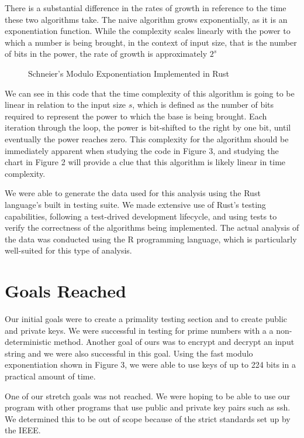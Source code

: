 \documentclass[11pt,technote]{IEEEtran}
\begin{document}
\par There is a substantial difference in the rates of growth in reference to
the time these two algorithms take. The naive algorithm grows exponentially, as
it is an exponentiation function. While the complexity scales linearly with the
power to which a number is being brought, in the context of input size, that is 
the number of bits in the power, the rate of growth is approximately $2^s$
\begin{figure}
	\begin{center}
		
		\caption{Schneier's Modulo Exponentiation Implemented in Rust\cite{sonsec}}
	\end{center}
\end{figure}
\par We can see in this code that the time complexity of this algorithm is going
to be linear in relation to the input size $s$, which is defined as the number
of bits required to represent the power to which the base is being brought. Each
iteration through the loop, the power is bit-shifted to the right by one bit,
until eventually the power reaches zero. This complexity for the algorithm
should be immediately apparent when studying the code in Figure 3, and studying
the chart in Figure 2 will provide a clue that this algorithm is likely linear
in time complexity.
\par We were able to generate the data used for this analysis using the Rust
language's built in testing suite. We made extensive use of Rust's testing
capabilities, following a test-drived development lifecycle, and using tests to
verify the correctness of the algorithms being implemented. The actual analysis
of the data was conducted using the R programming language, which is
particularly well-suited for this type of analysis.
\section{Goals Reached}
Our initial goals were to create a primality testing section and to create 
public and private keys. We were successful in testing for prime numbers with a 
a non-deterministic method. Another goal of ours was to encrypt and decrypt an 
input string and we were also successful in this goal. Using the fast modulo
exponentiation shown in Figure 3, we were able to use keys of up to 224 bits in
a practical amount of time.
\par One of our stretch goals was not reached. We were hoping to be able to use 
our program with other programs that use public and private key pairs such as 
ssh. We determined this to be out of scope because of the strict standards set 
up by the IEEE. 
\end{document}
